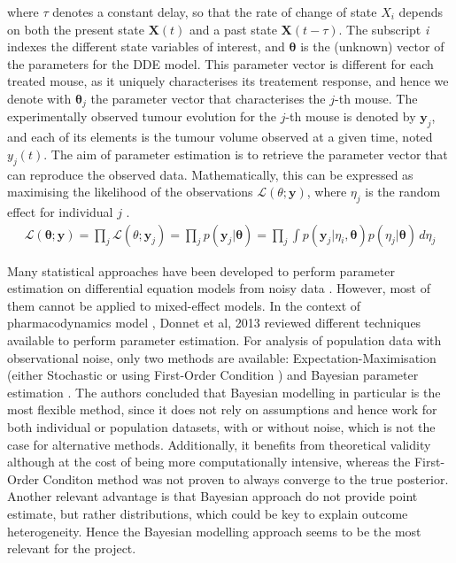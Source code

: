\documentclass[11pt]{article}
\begin{document}
where $\tau$ denotes a constant delay, so that the rate of change of state $X_i$ depends on both the present state $\boldsymbol{X}(t)$ and a past state $\boldsymbol{X}(t-\tau)$. The subscript \textit{i} indexes the different state variables of interest, and $\boldsymbol{\theta}$ is the (unknown) vector of the parameters for the DDE model. This parameter vector is different for each treated mouse, as it uniquely characterises its treatement response, and hence we denote with $\boldsymbol{\theta}_j$ the parameter vector that characterises the $j$-th mouse. The experimentally observed tumour evolution for the $j$-th mouse is denoted by $\boldsymbol{y}_j$, and each of its elements is the tumour volume observed at a given time, noted $y_{j}(t)$. The aim of parameter estimation is to retrieve the parameter vector that can reproduce the observed data. Mathematically, this can be expressed as maximising the likelihood of the observations $\mathcal{L}(\theta;\boldsymbol{y})$, where $\eta_j$ is the random effect for individual $j$ \cite{SAEM}. 
\begin{align*}
    \mathcal{L}(\boldsymbol{\theta};\boldsymbol{y})=\prod_{j} \mathcal{L}(\theta;\boldsymbol{y}_j)=\prod_j p(\boldsymbol{y}_j\vert \boldsymbol{\theta})=\prod_j \int p(\boldsymbol{y}_j\vert \eta_i,\boldsymbol{\theta})p(\eta_j\vert \boldsymbol{\theta}) \,d\eta_j
\end{align*}

Many statistical approaches have been developed to perform parameter estimation on differential equation models from noisy data \cite{liu_wang}. However, most of them cannot be applied to mixed-effect models. In the context of pharmacodynamics model , Donnet et al, 2013 \cite{revParamEst} reviewed different techniques available to perform parameter estimation. For analysis of population data with observational noise, only two methods are available: Expectation-Maximisation (either Stochastic \cite{SAEM} or using First-Order Condition \cite{foce}) and Bayesian parameter estimation \cite{rosenbaum}. The authors concluded that Bayesian modelling in particular is the most flexible method, since it does not rely on assumptions and hence work for both individual or population datasets, with or without noise, which is not the case for alternative methods. Additionally, it benefits from theoretical validity although at the cost of being more computationally intensive, whereas the First-Order Conditon method was not proven to always converge to the true posterior. Another relevant advantage is that Bayesian approach do not provide point estimate, but rather distributions, which could be key to explain outcome heterogeneity. Hence the Bayesian modelling approach seems to be the most relevant for the project. 
\end{document}
